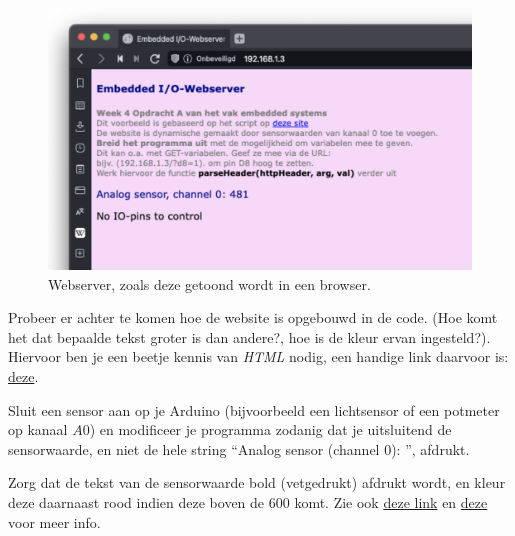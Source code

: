 \begin{figure}[h!]
\centering\includegraphics[scale=0.2]{Pictures/chapter01/webserver.png}
\caption{Webserver, zoals deze getoond wordt in een browser.}
\label{fig:webserver} %
\end{figure}

\begin{exercise}
    Probeer er achter te komen hoe de website is opgebouwd in de code. (Hoe komt het dat bepaalde tekst groter is dan andere?, hoe is de kleur ervan ingesteld?). Hiervoor ben je een beetje kennis van \textit{HTML} nodig, een handige link daarvoor is: \href{https://learnxinyminutes.com/docs/nl-nl/html-nl/}{deze}. 
\end{exercise}

\begin{exercise}
Sluit een sensor aan op je Arduino (bijvoorbeeld een lichtsensor of een potmeter op kanaal $A0$) en modificeer je programma zodanig dat je uitsluitend de sensorwaarde, en niet de hele string “Analog sensor (channel 0): ”, afdrukt.
\end{exercise}

\begin{exercise}
    Zorg dat de tekst van de sensorwaarde bold (vetgedrukt) afdrukt wordt, en kleur deze daarnaast rood indien deze boven de $600$ komt. Zie ook \href{https://www.w3schools.com/html/html_formatting.asp}{deze link} en \href{https://www.w3schools.com/html/html_colors.asp}{deze} voor meer info.
\end{exercise}


